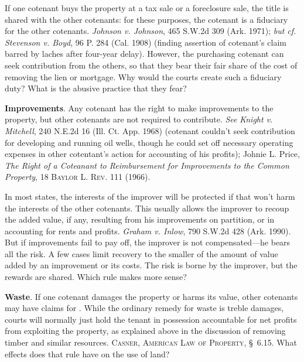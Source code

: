 If one cotenant buys the property at a tax sale or a foreclosure sale, the
title is shared with the other cotenants: for these purposes, the cotenant is
a fiduciary for the other cotenants. \emph{Johnson v. Johnson}, 465 S.W.2d 309
(Ark. 1971); \textit{but cf.} \emph{Stevenson v. Boyd}, 96 P. 284 (Cal. 1908)
(finding assertion of cotenant's claim barred by laches after four-year delay).
However, the purchasing cotenant can seek contribution from the others, so that
they bear their fair share of the cost of removing the lien or mortgage. Why
would the courts create such a fiduciary duty? What is the abusive practice that
they fear?


\item \label{martin-improvements}\textbf{Improvements}. Any cotenant has the
right
to make improvements to the property, but other cotenants are not required to
contribute. \emph{See} \emph{Knight v. Mitchell}, 240 N.E.2d 16 (Ill. Ct. App.
1968) (cotenant couldn't seek contribution for developing and running oil wells,
though he could set off necessary operating expenses in other cotentant's action
for accounting of his profits); Johnie L. Price, \textit{The Right of a
Coteanant to Reimbursement for Improvements to the Common Property}, 18
\textsc{Baylor L. Rev}. 111 (1966).

In most states, the interests of the improver will be protected if that won't
harm the interests of the other cotenants. This usually allows the improver to
recoup the added value, if any, resulting from his improvements on partition, or
in accounting for rents and profits. \emph{Graham v. Inlow}, 790 S.W.2d 428
(Ark. 1990). But if improvements fail to pay off, the improver is not
compensated---he bears all the risk. A few cases limit recovery to the smaller
of the amount of value added by an improvement or its costs. The risk is borne
by the improver, but the rewards are shared. Which rule makes more sense?

\item \textbf{Waste}. If one cotenant damages the property or harms
its value, other cotenants may have claims for . While the ordinary
remedy for waste is treble damages, courts will normally just hold the tenant
in possession accountable for net profits from exploiting the property, as
explained above in the discussion of removing timber and similar resources.
\textsc{Casner, American Law of Property}, \S~6.15. What effects does that
rule have on the use of land?


